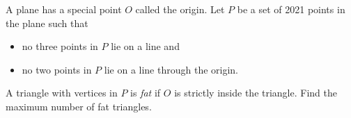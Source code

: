 A plane has a special point $O$ called the origin. Let $P$ be a set of 2021 points in the plane such that
\begin{itemize}
	\item no three points in $P$ lie on a line and
	\item no two points in $P$ lie on a line through the origin.
\end{itemize}
A triangle with vertices in $P$ is \textit{fat} if $O$ is strictly inside the triangle. Find the maximum number of fat triangles.
